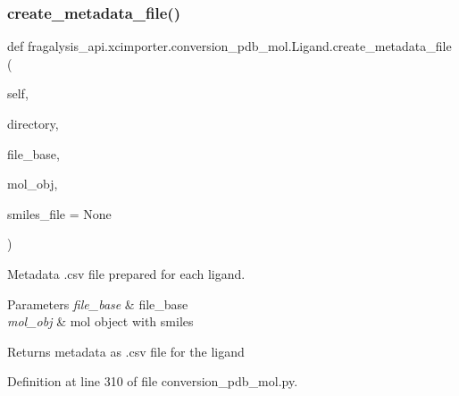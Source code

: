 \subsubsection{\texorpdfstring{create\+\_\+metadata\+\_\+file()}{create\_metadata\_file()}}
{\footnotesize\ttfamily def fragalysis\+\_\+api.\+xcimporter.\+conversion\+\_\+pdb\+\_\+mol.\+Ligand.\+create\+\_\+metadata\+\_\+file (\begin{DoxyParamCaption}\item[{}]{self,  }\item[{}]{directory,  }\item[{}]{file\+\_\+base,  }\item[{}]{mol\+\_\+obj,  }\item[{}]{smiles\+\_\+file = {\ttfamily None} }\end{DoxyParamCaption})}



Metadata .csv file prepared for each ligand. 


\begin{DoxyParams}{Parameters}
{\em file\+\_\+base} & file\+\_\+base \\
\hline
{\em mol\+\_\+obj} & mol object with smiles \\
\hline
\end{DoxyParams}
\begin{DoxyReturn}{Returns}
metadata as .csv file for the ligand 
\end{DoxyReturn}


Definition at line 310 of file conversion\+\_\+pdb\+\_\+mol.\+py.


